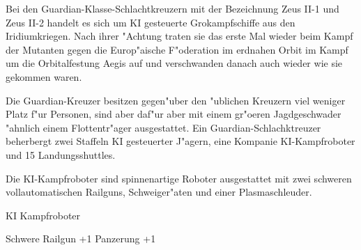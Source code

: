 
Bei den Guardian-Klasse-Schlachtkreuzern mit der Bezeichnung Zeus II-1 und Zeus II-2 handelt es sich um KI gesteuerte Gro\3kampfschiffe aus den Iridiumkriegen. Nach ihrer "Achtung traten sie das erste Mal wieder beim Kampf der Mutanten gegen die Europ"aische F"oderation im erdnahen Orbit im Kampf um die Orbitalfestung Aegis auf und verschwanden danach auch wieder wie sie gekommen waren.

Die Guardian-Kreuzer besitzen gegen"uber den "ublichen Kreuzern viel weniger Platz f"ur Personen, sind aber daf"ur aber mit einem gr"o\3eren Jagdgeschwader "ahnlich einem Flottentr"ager ausgestattet. Ein Guardian-Schlachktreuzer beherbergt zwei Staffeln KI gesteuerter J"agern, eine Kompanie KI-Kampfroboter und 15 Landungsshuttles.

Die KI-Kampfroboter sind spinnenartige Roboter ausgestattet mit zwei schweren vollautomatischen Railguns, Schwei\3ger"aten und einer Plasmaschleuder.

\begin{nscsheet}[f]{KI Kampfroboter}
    \nscstats[ATT=3,AGG=3,CON=2]
    \nscruler
    \begin{nscinventory}
        \nscitem[Waffen] Schwere Railgun +1
        \nscitem[R"ustung] Panzerung +1
    \end{nscinventory}
\end{nscsheet}
